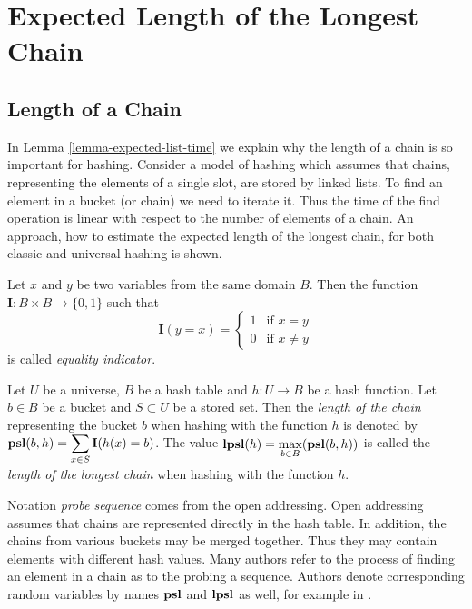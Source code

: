 \chapter{Expected Length of the Longest Chain}
\label{chapter-elpsl}

\section{Length of a Chain}
In Lemma \ref{lemma-expected-list-time} we explain why the length of a chain is so important for hashing. Consider a model of hashing which assumes that chains, representing the elements of a single slot, are stored by linked lists. To find an element in a bucket (or chain) we need to iterate it. Thus the time of the find operation is linear with respect to the number of elements of a chain. An approach, how to estimate the expected length of the longest chain, for both classic and universal hashing is shown.

\begin{definition}
Let $x$ and $y$ be two variables from the same domain $B$. Then the function $\mathbf{I}: B \times B \rightarrow \{0, 1\}$ such that
\[
 \mathbf{I}(y = x) =
  \begin{cases}
   1 & \text{if } x = y \\
   0 & \text{if } x \neq y
  \end{cases}
\]
is called \emph{equality indicator}.
\end{definition}

\begin{definition}
Let $U$ be a universe, $B$ be a hash table and $h: U \rightarrow B$ be a hash function. Let $b \in B$ be a bucket and $S \subset U$ be a stored set. Then the \emph{length of the chain} representing the bucket $b$ when hashing with the function $h$ is denoted by $\mathbf{psl}(b, h) = \displaystyle \sum_{x \in S} \mathbf{I}(h(x) = b)$. The value $\mathbf{lpsl}(h) = \displaystyle \max_{b \in B} (\mathbf{psl}(b, h))$ is called the \emph{length of the longest chain} when hashing with the function $h$.
\end{definition}

Notation \emph{probe sequence} comes from the open addressing. Open addressing assumes that chains are represented directly in the hash table. In addition, the chains from various buckets may be merged together. Thus they may contain elements with different hash values. Many authors refer to the process of finding an element in a chain as to the probing a sequence. Authors denote corresponding random variables by names $\mathbf{psl}$ and $\mathbf{lpsl}$ as well, for example in \cite{10.1109/SFCS.1985.48}.

